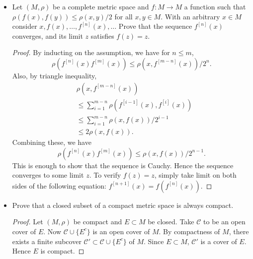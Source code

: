 \begin{itemize}
\begin{proof}
	Using a similar argument as above we can show that for $m> M$, the convergence of $\lim_{K \to \infty} \sum_{n=1}^{K} \left| x^{(m')}_n - x^{(m)}_n \right|$ is uniform in  $m'$. 
	Now we show that $x^{(m)}\to x$ with respect to $\rho$. Recall that $\left( x^{(m)} \right) $ being Cauchy implies $\rho\left(x^{(m)}, x^{(m')}\right) < \varepsilon$ for $m, m' > M$. Hence for $m > M$,
	\begin{align*}
		\rho(x, x^{(m)}) 
		&= \sum_{n=1}^{\infty} \left| \lim_{m' \to \infty}  x^{(m')}_n - x^{(m)}_n \right|  \\
		&= \lim_{K \to \infty} \lim_{m' \to \infty} \sum_{n=1}^{K} \left| x^{(m')}_n - x^{(m)}_n \right|  \\
		&= \lim_{m' \to \infty} \lim_{K \to \infty} \sum_{n=1}^{K} \left| x^{(m')}_n - x^{(m)}_n \right| \\
		&= \lim_{m' \to \infty} \rho\left(x^{(m')}, x^{(m)}\right) \\
		&\le \varepsilon
	.\end{align*}
	\end{proof}
\item Let $(M, \rho)$ be a complete metric space and $f: M \to  M$ a function such that $\rho(f(x), f(y)) \le  \rho(x,y) / 2$ for all  $x, y \in M$. With an arbitrary $x \in M$ consider $x, f(x), \ldots, f^{[n]}(x), \ldots$
	Prove that the sequence $f^{[n]}(x)$ converges, and its limit $z$ satisfies $f(z) = z$.
	\begin{proof}
		By inducting on the assumption, we have for  $n \le m$,
		\[
			\rho\left(f^{[n]}(x) f^{[m]}(x)\right) \le  \rho\left( x, f^{[m-n]}(x) \right)/ 2^n
		.\] 
		Also, by triangle inequality,
		\begin{align*}
			&\rho\left(x, f^{[m-n]}(x)\right) \\
			&\le  \sum_{i=1}^{m-n} \rho\left(f^{[i-1]}(x), f^{[i]}(x)\right) \\
			&\le  \sum_{i=1}^{m-n} \rho\left(x, f(x)\right) / 2^{i-1} \\
			&\le 2 \rho(x, f(x))
		.\end{align*} 
		Combining these, we have 
		\[
			\rho\left(f^{[n]}(x) f^{[m]}(x)\right) \le  \rho\left(x, f(x)\right) / 2^{n-1}
		.\] 
		This is enough to show that the sequence is Cauchy. Hence the sequence converges to some limit $z$. To verify $f(z) = z$, simply take limit on both sides of the following equation: $f^{[n+1]}(x) = f\left( f^{[n]}(x) \right) $.
	\end{proof}
\item Prove that a closed subset of a compact metric space is always compact.
\begin{proof}
	Let $(M, \rho)$ be compact and $E \subset M$ be closed. Take $\mathcal{C}$ to be an open cover of $E$. Now $\mathcal{C} \cup \{E^c\} $ is an open cover of $M$. By compactness of $M$, there exists a finite subcover $\mathcal{C}' \subset  \mathcal{C} \cup \{E^c\} $ of $M$. Since $E \subset M$, $\mathcal{C}'$ is a cover of $E$. Hence $E$ is compact.
\end{proof}


\end{itemize}
